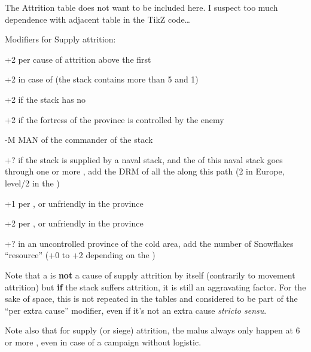 \begin{todo}
  The Attrition table does not want to be included here. I suspect too much
  dependence with adjacent table in the TikZ code\ldots
\end{todo}


Modifiers for Supply attrition:
\begin{modlist}
\item[+2] per cause of attrition above the first
\item[+2] in case of  (the stack contains more than 5\LD
  and 1\Pasha)
\item[+2] if the stack has no \LoS
\item[+2] if the fortress of the province is controlled by the enemy
\item[-M] MAN of the commander of the stack
\item[+?] if the stack is supplied by a naval stack, and the \LoS of this
  naval stack goes through one or more \StraitFort, add the DRM of all the
  \StraitFort along this path (2 in Europe, level/2 in the \ROTW)
\item[+1] per \PILLAGE\facemoins, \REVOLT\facemoins or unfriendly
  \REBELLION\facemoins in the province
\item[+2] per \PILLAGE\faceplus, \REVOLT\faceplus or unfriendly
  \REBELLION\faceplus in the province
\item[+?] in an uncontrolled province of the \ROTW cold area, add the number
  of Snowflakes ``resource'' (+0 to +2 depending on the \Area)
\end{modlist}

\begin{designnote}
  Note that a  is \textbf{not} a cause of supply attrition
  by itself (contrarily to movement attrition) but \textbf{if} the stack
  suffers attrition, it is still an aggravating factor. For the sake of space,
  this is not repeated in the tables and considered to be part of the ``per
  extra cause'' modifier, even if it's not an extra cause \emph{stricto
    sensu}.

  \smallskip

  Note also that for supply (or siege) attrition, the 
  malus always only happen at 6 or more \LD, even in case of a campaign
  without logistic.
\end{designnote}

